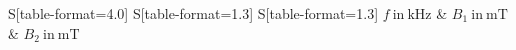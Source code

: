 \begin{table}
    \centering
    \caption{Bei der Regression verwendete Werte, die Unsicherheit beträgt für alle $B_1, B_2$ \SI{2.9}{\micro\tesla}}
    \label{tab:Regression}
    \begin{tabular}{
	S[table-format=4.0]
	S[table-format=1.3]
	S[table-format=1.3]
	}
	\toprule
	{$f \ \mathrm{in} \ \si{\kilo\hertz}$}		& {$B_1 \ \mathrm{in} \ \si{\milli\tesla}$}		& 
	{$B_2 \ \mathrm{in} \ \si{\milli\tesla}$}		\\ 
	\midrule
    
    \bottomrule
    \end{tabular}
    \end{table}
